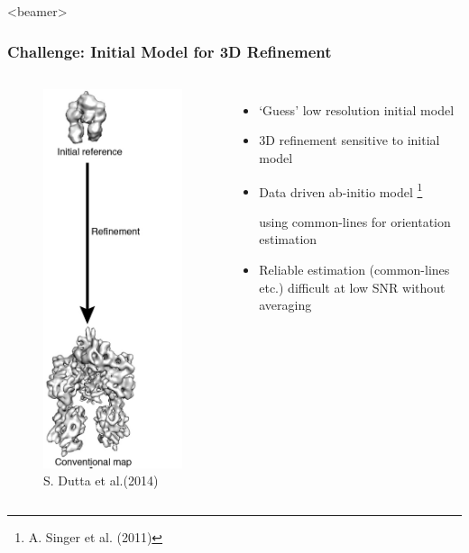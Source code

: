 \documentclass{beamer}
\newcommand\blfootnote[1]{%
  \begingroup
  \renewcommand\thefootnote{}\footnote{#1}%
  \addtocounter{footnote}{-1}%
  \endgroup
}
\begin{document}
\begin{frame}<beamer>
\frametitle{Challenge: Initial Model for 3D Refinement}
\begin{columns}
\begin{figure}
\centering
\includegraphics[width=.4 \columnwidth]{figures/refinement.png}\caption{S. Dutta et al.(2014)}
\end{figure}
\begin{itemize}
\item `Guess' low resolution initial model
 \item 3D refinement sensitive to initial model
 \item Data driven ab-initio model \blfootnote{ A. Singer et al. (2011)} using common-lines for orientation estimation
 \item Reliable estimation (common-lines etc.) difficult at low SNR without averaging
\end{itemize}
\end{columns}
\end{frame}
\end{document}
